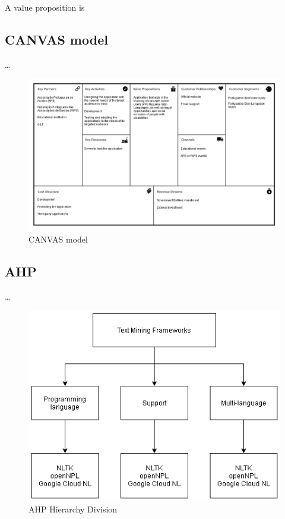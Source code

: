 A value proposition is 

\subsection{CANVAS model}

\dots

\begin{figure}[H]
\centering
\includegraphics[width=\textwidth,keepaspectratio]{ch2/assets/CANVAS.png}
\caption[CANVAS]{CANVAS model}
\label{fig:CANVAS}
\end{figure}

\subsection{AHP}

\dots

\begin{figure}[H]
\centering
\includegraphics[scale=0.5]{ch2/assets/AHP.png}
\caption[AHP Hierarchy Division]{AHP Hierarchy Division}
\label{fig:AHP}
\end{figure}

